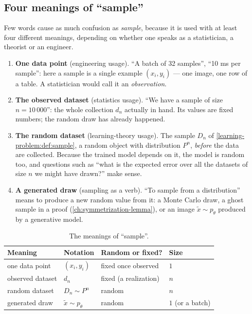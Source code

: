 \begin{notechapter}
\subsection{Four meanings of ``sample''}\label{learning-problem:sec:sample-meanings}

Few words cause as much confusion as \emph{sample}, because it is used with at
least four different meanings, depending on whether one speaks as a
statistician, a theorist or an engineer.

\begin{enumerate}
  \item \textbf{One data point} (engineering usage). ``A batch of 32
        samples'', ``10 ms per sample'': here a sample is a single example
        $(x_i,y_i)$ --- one image, one row of a table. A statistician would
        call it an \emph{observation}.
  \item \textbf{The observed dataset} (statistics usage). ``We have a sample
        of size $n = 10\,000$'': the whole collection $d_n$ actually in hand.
        Its values are fixed numbers; the random draw has already happened.
  \item \textbf{The random dataset} (learning-theory usage). The sample $D_n$
        of \cref{learning-problem:def:sample}, a random object with
        distribution $P^n$, \emph{before} the data are collected. Because the
        trained model depends on it, the model is random too, and questions
        such as ``what is the expected error over all the datasets of size $n$
        we might have drawn?'' make sense.
  \item \textbf{A generated draw} (sampling as a verb). ``To sample from a
        distribution'' means to produce a new random value from it: a Monte
        Carlo draw, a ghost sample in a proof (\cref{ch:symmetrization-lemma}),
        or an image $\tilde x\sim p_\theta$ produced by a generative model.
\end{enumerate}

\begin{table}[ht]
\centering
\caption{The meanings of ``sample''.}
\label{learning-problem:tab:sample}
\begin{tabular}{@{}llll@{}}
\toprule
Meaning & Notation & Random or fixed? & Size \\
\midrule
one data point & $(x_i, y_i)$ & fixed once observed & $1$ \\
observed dataset & $d_n$ & fixed (a realization) & $n$ \\
random dataset & $D_n\sim P^n$ & random & $n$ \\
generated draw & $\tilde x\sim p_\theta$ & random & $1$ (or a batch) \\
\bottomrule
\end{tabular}
\end{table}


\end{notechapter}
